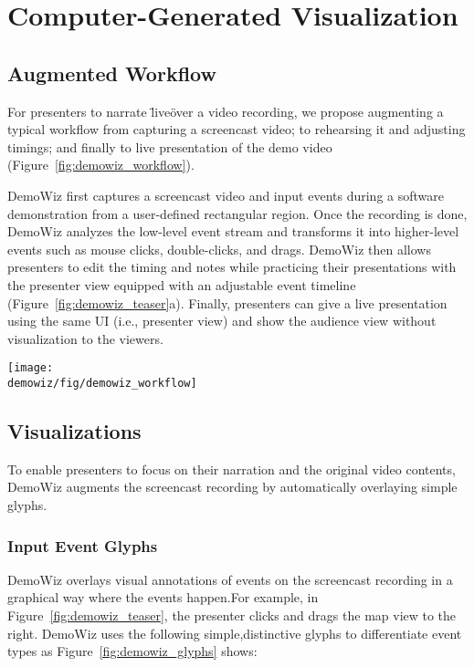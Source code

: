 \section{Computer-Generated Visualization}

\subsection{Augmented Workflow}
For presenters to narrate \"live\" over a video recording, we propose augmenting a typical workflow from capturing a screencast video; to rehearsing it and adjusting timings; and finally to live presentation of the demo video (Figure~\ref{fig:demowiz_workflow}).

DemoWiz first captures a screencast video and input events during a software demonstration from a user-defined rectangular region. Once the recording is done, DemoWiz analyzes the low-level event stream and transforms it into higher-level events such as mouse clicks, double-clicks, and drags. DemoWiz then allows presenters to edit the timing and notes while practicing their presentations with the presenter view equipped with an adjustable event timeline (Figure~\ref{fig:demowiz_teaser}a). Finally, presenters can give a live presentation using the same UI (i.e., presenter view) and show the audience view without visualization to the viewers.

\begin{figure*}[t]
  \centering
  \texttt{[image: \\demowiz/fig/demowiz\_workflow]}
  \caption{DemoWiz workflow: Presenters captures a software demonstration, edit the recording while rehearsing with our playback UI, and present the edited video to the audience using a presenter view.}
  \label{fig:demowiz_workflow}
\end{figure*}


\subsection{Visualizations}
To enable presenters to focus on their narration and the original video contents, DemoWiz augments the screencast recording by automatically overlaying simple glyphs.

\subsubsection{Input Event Glyphs}
DemoWiz overlays visual annotations of events on the screencast recording in a graphical way where the events happen.For example, in Figure~\ref{fig:demowiz_teaser}, the presenter clicks and drags the map view to the right. DemoWiz uses the following simple,distinctive glyphs to differentiate event types as Figure~\ref{fig:demowiz_glyphs} shows:


